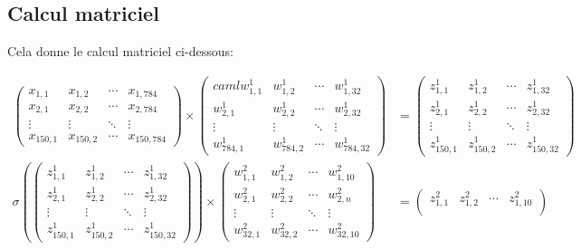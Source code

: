\subsection{Calcul matriciel}

Cela donne le calcul matriciel ci-dessous:
\begin{footnotesize}
\begin{align*}
\begin{pmatrix}
x_{1,1} & x_{1,2} & \cdots & x_{1,784} \\
x_{2,1} & x_{2,2} & \cdots & x_{2,784} \\
\vdots  & \vdots  & \ddots & \vdots  \\
x_{150,1} & x_{150,2} & \cdots & x_{150,784} 
\end{pmatrix}
\times
\begin{pmatrix}caml
w^1_{1,1} & w^1_{1,2} & \cdots & w^1_{1,32} \\
w^1_{2,1} & w^1_{2,2} & \cdots & w^1_{2,32} \\
\vdots  & \vdots  & \ddots & \vdots  \\
w^1_{784,1} & w^1_{784,2} & \cdots & w^1_{784,32} 
\end{pmatrix}
&= 
\begin{pmatrix}
z^1_{1,1} & z^1_{1,2} & \cdots & z^1_{1,32} \\
z^1_{2,1} & z^1_{2,2} & \cdots & z^1_{2,32} \\
\vdots  & \vdots  & \ddots & \vdots  \\
z^1_{150,1} & z^1_{150,2} & \cdots & z^1_{150,32} 
\end{pmatrix}
\\
\sigma(
\begin{pmatrix}
z^1_{1,1} & z^1_{1,2} & \cdots & z^1_{1,32} \\
z^1_{2,1} & z^1_{2,2} & \cdots & z^1_{2,32} \\
\vdots  & \vdots  & \ddots & \vdots  \\
z^1_{150,1} & z^1_{150,2} & \cdots & z^1_{150,32} 
\end{pmatrix}
)
\times
\begin{pmatrix}
w^2_{1,1} & w^2_{1,2} & \cdots & w^2_{1,10} \\
w^2_{2,1} & w^2_{2,2} & \cdots & w^2_{2,n} \\
\vdots  & \vdots  & \ddots & \vdots  \\
w^2_{32,1} & w^2_{32,2} & \cdots & w^2_{32,10} 
\end{pmatrix}
&= 
\begin{pmatrix}
z^2_{1,1} & z^2_{1,2} & \cdots & z^2_{1,10} \\

\end{pmatrix}
\end{align*}
\end{footnotesize}
